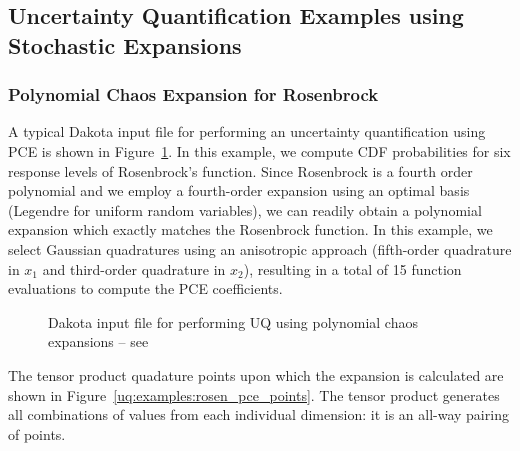 \subsection{Uncertainty Quantification Examples using Stochastic Expansions} \label{uq:stoch_exp:ex}

\subsubsection{Polynomial Chaos Expansion for Rosenbrock}
\label{uq:stoch_exp:ex:pce}


A typical Dakota input file for performing an uncertainty
quantification using PCE is shown in
Figure~\ref{uq:examples:pce_input}.  In this example, we compute CDF
probabilities for six response levels of Rosenbrock's function. Since
Rosenbrock is a fourth order polynomial and we employ a fourth-order
expansion using an optimal basis (Legendre for uniform random
variables), we can readily obtain a polynomial expansion which exactly
matches the Rosenbrock function. In this example, we select Gaussian
quadratures using an anisotropic approach (fifth-order quadrature in
$x_1$ and third-order quadrature in $x_2$), resulting in a total of 15
function evaluations to compute the PCE coefficients.

\begin{figure}[htbp!]
  \centering
  \begin{bigbox}
    \begin{small}
    \end{small}
  \end{bigbox}
\caption{Dakota input file for performing UQ using polynomial chaos expansions --
see \protect{} }
\label{uq:examples:pce_input}
\end{figure}

The tensor product quadature points upon which the expansion is calculated 
are shown in Figure~\ref{uq:examples:rosen_pce_points}. 
The tensor product generates
all combinations of values from each individual dimension: it is an 
all-way pairing of points.

